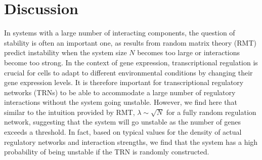 \documentclass[10pt]{article}
\begin{document}
 

\section*{Discussion} 
In systems with a large number of interacting components, the question of stability is often an important one, as results from random matrix theory (RMT) predict instability when the system size $N$ becomes too large or interactions become too strong. In the context of gene expression, transcriptional regulation is crucial for cells to adapt to different environmental conditions by changing their gene expression levels. It is therefore important for transcriptional regulatory networks (TRNs) to be able to accommodate a large number of regulatory interactions without the system going unstable. However, we find here that similar to the intuition provided by RMT, $\lambda \sim \sqrt{N}$ for a fully random regulation network, suggesting that the system will go unstable as the number of genes exceeds a threshold. In fact, based on typical values for the density of actual regulatory networks and interaction strengths, we find that the system has a high probability of being unstable if the TRN is randomly constructed.
\end{document}
